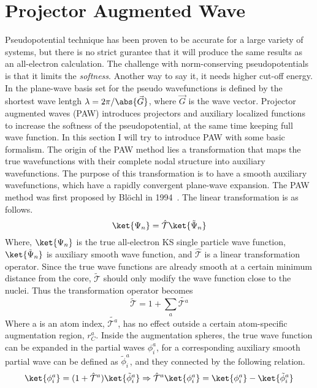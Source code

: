 \chapter{Projector Augmented Wave}\label{appen_paw}

Pseudopotential technique has been proven to be accurate for a large variety of systems, but there is no strict gurantee that it will produce the same results as an all-electron calculation. The challenge with norm-conserving pseudopotentials is that it limits the \textit{softness}. Another way to say it, it needs higher cut-off energy. In the plane-wave basis set for the pseudo wavefunctions is defined by the shortest wave lentgh $\lambda=2\pi/\abs{\vec{G}}$, where $\vec{G}$ is the wave vector. Projector augmented waves (PAW) introduces projectors and auxiliary localized functions to increase the softness of the pseudopotential, at the same time keeping full wave function. In this section I will try to introduce PAW with some basic formalism. The origin of the PAW method lies a transformation that maps the true wavefunctions with their complete nodal structure into auxiliary wavefunctions. The purpose of this transformation is to have a smooth auxiliary wavefunctions, which have a rapidly convergent plane-wave expansion. The PAW method was first proposed by Bl\"ochl in 1994~\cite{blochl1994projector}. The linear transformation is as follows.
\begin{equation}
\ket{\Psi_n} = \hat{\mathcal{T}}\ket{\tilde{\Psi}_n}
\end{equation}
Where, $\ket{\Psi_n}$ is the true all-electron KS single particle wave function, $\ket{\tilde{\Psi}_n}$ is auxiliary smooth wave function, and $\hat{\mathcal{T}}$ is a linear transformation operator. Since the true wave functions are already smooth at a certain minimum distance from the core, $\tilde{\mathcal{T}}$ should only modify the wave function close to the nuclei. Thus the transformation operator becomes
\begin{equation}
\tilde{\mathcal{T}} = 1 + \sum_a \tilde{\mathcal{T}^a}
\end{equation}
Where a is an atom index, $\tilde{\mathcal{T}^a}$, has no effect outside a certain atom-specific augmentation region, $r_C^a$. Inside the augmentation spheres, the true wave function can be expanded in the partial waves $\phi_i^a$, for a corresponding auxiliary smooth partial wave can be defined as $\tilde{\phi}_i^a$, and they connected by the following relation.
\begin{equation}
\label{eq_aug_t}
\ket{\phi_i^a} = (1+\hat{\mathcal{T}}^a)\ket{\tilde{\phi}_i^a} \Rightarrow  \hat{\mathcal{T}}^a \ket{\phi_i^a} = \ket{\phi_i^a} - \ket{\tilde{\phi}_i^a}
\end{equation} 
